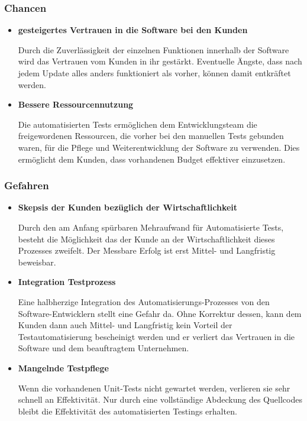 \subsubsection{Chancen}
\begin{itemize}	
	\item \textbf{gesteigertes Vertrauen in die Software bei den Kunden}
	
	Durch die Zuverlässigkeit der einzelnen Funktionen innerhalb der Software wird das Vertrauen vom Kunden in ihr gestärkt. Eventuelle Ängste, dass nach jedem Update alles anders funktioniert als vorher, können damit entkräftet werden.
	
	\item \textbf{Bessere Ressourcennutzung}
	
	Die automatisierten Tests ermöglichen dem Entwicklungsteam die freigewordenen Ressourcen, die vorher bei den manuellen Tests gebunden waren, für die Pflege und Weiterentwicklung der Software zu verwenden. Dies ermöglicht dem Kunden, dass vorhandenen Budget effektiver einzusetzen.
	
\end{itemize}
	\subsubsection{Gefahren}
\begin{itemize}	
	\item \textbf{Skepsis der Kunden bezüglich der Wirtschaftlichkeit}
	
	Durch den am Anfang spürbaren Mehraufwand für Automatisierte Tests, besteht die Möglichkeit das der Kunde an der Wirtschaftlichkeit dieses Prozesses zweifelt. Der Messbare Erfolg ist erst Mittel- und Langfristig beweisbar.
	
	\item \textbf{Integration Testprozess}
	
	Eine halbherzige Integration des Automatisierungs-Prozesses von den Software-Entwicklern stellt eine Gefahr da. Ohne Korrektur dessen, kann dem Kunden dann auch Mittel- und Langfristig kein Vorteil der Testautomatisierung bescheinigt werden und er verliert das Vertrauen in die Software und dem beauftragtem Unternehmen.
	
	\item \textbf{Mangelnde Testpflege}
	
	Wenn die vorhandenen Unit-Tests nicht gewartet werden, verlieren sie sehr schnell an Effektivität. Nur durch eine vollständige Abdeckung des Quellcodes bleibt die Effektivität des automatisierten Testings erhalten.
	
	
\end{itemize}

